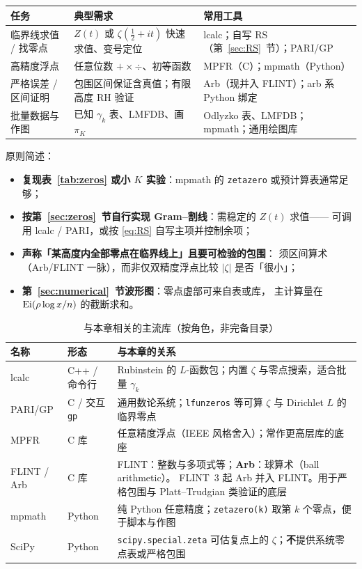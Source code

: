 \begin{center}
\renewcommand{\arraystretch}{1.25}
\begin{tabular}{@{}p{3.2cm}p{4.0cm}p{5.8cm}@{}}
\toprule
\textbf{任务} & \textbf{典型需求} & \textbf{常用工具} \\
\midrule
临界线求值 / 找零点
  & $Z(t)$ 或 $\zeta(\tfrac12+it)$ 快速求值、变号定位
  & lcalc；自写 RS（第~\ref{sec:RS}~节）；PARI/GP \\
高精度浮点
  & 任意位数 $+\times\div$、初等函数
  & MPFR（C）；mpmath（Python） \\
严格误差 / 区间证明
  & 包围区间保证含真值；有限高度 RH 验证
  & Arb（现并入 FLINT）；arb 系 Python 绑定 \\
批量数据与作图
  & 已知 $\gamma_k$ 表、LMFDB、画 $\pi_K$
  & Odlyzko 表、LMFDB；mpmath；通用绘图库 \\
\bottomrule
\end{tabular}
\end{center}

\noindent
原则简述：
\begin{itemize}
  \item \textbf{复现表~\ref{tab:zeros} 或小 $K$ 实验}：mpmath 的 \texttt{zetazero} 或预计算表通常足够；
  \item \textbf{按第~\ref{sec:zeros}~节自行实现 Gram--割线}：需稳定的 $Z(t)$ 求值——
        可调用 lcalc / PARI，或按 \eqref{eq:RS} 自写主项并控制余项；
  \item \textbf{声称「某高度内全部零点在临界线上」且要可检验的包围}：
        须区间算术（Arb/FLINT 一脉），而非仅双精度浮点比较 $|\zeta|$ 是否「很小」；
  \item \textbf{第~\ref{sec:numerical}~节波形图}：零点虚部可来自表或库，
        主计算量在 $\operatorname{Ei}(\rho\log x/n)$ 的截断求和。
\end{itemize}

\begin{table}[htbp]
\centering
\caption{与本章相关的主流库（按角色，非完备目录）}
\label{tab:libraries}
\small
\begin{tabular}{@{}p{2.3cm}p{1.6cm}p{9.2cm}@{}}
\toprule
名称 & 形态 & 与本章的关系 \\
\midrule
lcalc
  & C++ / 命令行
  & Rubinstein 的 $L$-函数包；内置 $\zeta$ 与零点搜索，适合批量 $\gamma_k$ \\
PARI/GP
  & C / 交互 \texttt{gp}
  & 通用数论系统；\texttt{lfunzeros} 等可算 $\zeta$ 与 Dirichlet $L$ 的临界零点 \\
MPFR
  & C 库
  & 任意精度浮点（IEEE 风格舍入）；常作更高层库的底座 \\
FLINT / Arb
  & C 库
  & FLINT：整数与多项式等；\textbf{Arb}：球算术（ball arithmetic）。
    FLINT~3 起 Arb 并入 FLINT。用于严格包围与 Platt--Trudgian 类验证的底层 \\
mpmath
  & Python
  & 纯 Python 任意精度；\texttt{zetazero(k)} 取第 $k$ 个零点，便于脚本与作图 \\
SciPy
  & Python
  & \texttt{scipy.special.zeta} 可估复点上的 $\zeta$；\textbf{不}提供系统零点表或严格包围 \\
\bottomrule
\end{tabular}
\end{table}

